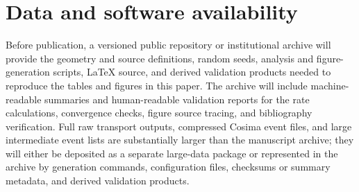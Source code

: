 \documentclass[preprint,12pt]{elsarticle}
\begin{document}
\section*{Data and software availability}
Before publication, a versioned public repository or institutional archive will
provide the geometry and source definitions, random seeds, analysis and
figure-generation scripts, LaTeX source, and derived validation products needed
to reproduce the tables and figures in this paper. The archive will include
machine-readable summaries and human-readable validation reports for the rate
calculations, convergence checks, figure source tracing, and bibliography
verification. Full raw transport outputs, compressed Cosima event files, and
large intermediate event lists are substantially larger than the manuscript
archive; they will either be deposited as a separate large-data package or
represented in the archive by generation commands, configuration files,
checksums or summary metadata, and derived validation products.
\end{document}
